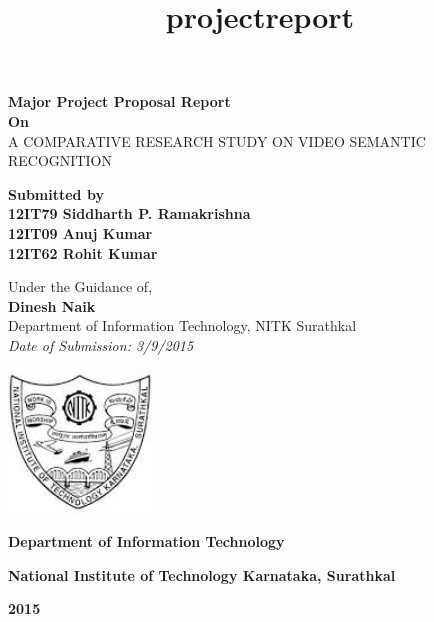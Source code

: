 \documentclass[a4paper,12pt]{article}
\title{projectreport}
\begin{document}
\thispagestyle{empty}
\begin{center}
\textbf{Major Project Proposal Report} \\
\textbf{On}\\
\vspace{2 mm}
\Large{\textsc{ A COMPARATIVE RESEARCH STUDY ON VIDEO SEMANTIC RECOGNITION }}   %

\vspace{7 mm}
\large{\textbf{                  %
Submitted by 
}}
\\
\large{\textbf{                  %
12IT79 Siddharth P. Ramakrishna \\
12IT09 Anuj Kumar \\
12IT62 Rohit Kumar \\
}}

\vspace{4 mm}
Under the Guidance of,\\
\textbf{Dinesh Naik}\\         %
Department of Information Technology, NITK Surathkal\\
\vspace{4 mm}
\textit{Date of Submission: 3/9/2015}
\vspace{14 mm}
	
		\includegraphics[width=1.5in,height=1.5in]
		{nitk.jpg}
 
\textbf{Department of Information Technology}

\textbf{National Institute of Technology Karnataka, Surathkal}

\textbf{2015}
\end{center}

\end{document}
